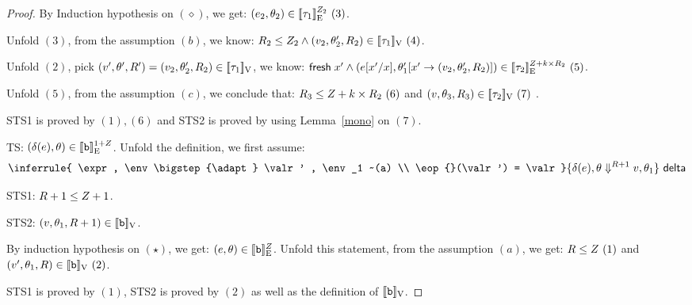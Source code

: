 \begin{proof}
By Induction hypothesis on $(\diamond)$,  we get: $ (\expr_2, \env_2) \in \lre{}{ \nnatA_2 }{ \type_1 } ~(3)$.

Unfold $(3)$, from the assumption $(b)$, we know: $\adapt_2 \leq \nnatA_2 \land (\valr_2, \env_2', \adapt_2) \in \lrv{\type_1} ~(4)$.

Unfold $(2)$, pick $(\valr', \env', R') = (\valr_2, \env_2', \adapt_2) \in \lrv{\type_1} $,  we know: $ \fresh \eapp x' \land  (  \expr[x'/x], \env_1'[ x'  \to (\valr_2, \env_2', \adapt_2  ) ]  ) \in \lre{}{\nnatA+\idx\times R_2 }{\type_2} ~(5) $.

Unfold $(5)$, from the assumption $(c)$, we conclude that: $ \adapt_3 \leq \nnatA+\idx\times R_2~(6)$ and $(\valr, \env_3, \adapt_3) \in \lrv{\type_2} ~(7) $ .

STS1 is proved by $(1), (6)$ and STS2 is proved by using Lemma~\ref{mono} on $(7)$. \\


 TS: $(\delta(\expr), \env ) \in  \lre{}{ 1+ \nnatA}{ \tbase }$.
 Unfold the definition, we first assume:
 \[ \inferrule{
    \expr , \env \bigstep{\adapt} \valr' , \env_1 ~(a) \\
    \eop{}(\valr') = \valr
  }{
    \eop(\expr), \env \bigstep{\adapt +1} \valr,  \env_1
  }~\textsf{delta}
  \]

  STS1: $\adapt+1 \leq \nnatA +1$.
  
STS2: $ (\valr, \env_1, \adapt+1) \in \lrv{\tbase} $.

By induction hypothesis on $(\star)$, we get: $ (\expr, \env) \in \lre{}{\nnatA}{\tbase} $.
Unfold this statement, from the assumption $(a)$, we get: $ \adapt \leq \nnatA~(1) $ and $ (\valr', \env_1, \adapt)  \in \lrv{\tbase}~(2)$.

STS1 is proved by $(1)$,  STS2 is proved by $(2)$ as well as the definition of $\lrv{\tbase}$.





 \end{proof} 